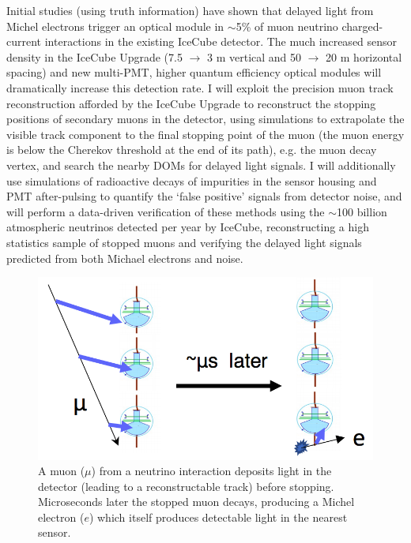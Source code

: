 \documentclass[a4paper,11pt]{article}
\begin{document}
Initial studies (using truth information) have shown that delayed light from Michel electrons trigger an optical module in $\sim$5\% of muon neutrino charged-current interactions in the existing IceCube detector. The much increased sensor density in the IceCube Upgrade (7.5 $\rightarrow$ 3 m vertical and 50 $\rightarrow$ 20 m horizontal spacing) and new multi-PMT, higher quantum efficiency optical modules will dramatically increase this detection rate. I will exploit the precision muon track reconstruction afforded by the IceCube Upgrade to reconstruct the stopping positions of secondary muons in the detector, using simulations to extrapolate the visible track component to the final stopping point of the muon (the muon energy is below the Cherekov threshold at the end of its path), e.g. the muon decay vertex, and search the nearby DOMs for delayed light signals. I will additionally use simulations of radioactive decays of impurities in the sensor housing and PMT after-pulsing to quantify the `false positive' signals from detector noise, and will perform a data-driven verification of these methods using the $\sim$100 billion atmospheric neutrinos detected per year by IceCube, reconstructing a high statistics sample of stopped muons and verifying the delayed light signals predicted from both Michael electrons and noise.




\begin{figure} %
    \centering
    \includegraphics[trim=0.0cm 0.0cm 0.0cm 0.0cm, clip=true, width=\linewidth]{images/michel_electron.png}
    \caption{A muon ($\mu$) from a neutrino interaction deposits light in the detector (leading to a reconstructable track) before stopping. Microseconds later the stopped muon decays, producing a Michel electron ($e$) which itself produces detectable light in the nearest sensor. }
    \label{fig:michel_electron}
\end{figure}
\end{document}
